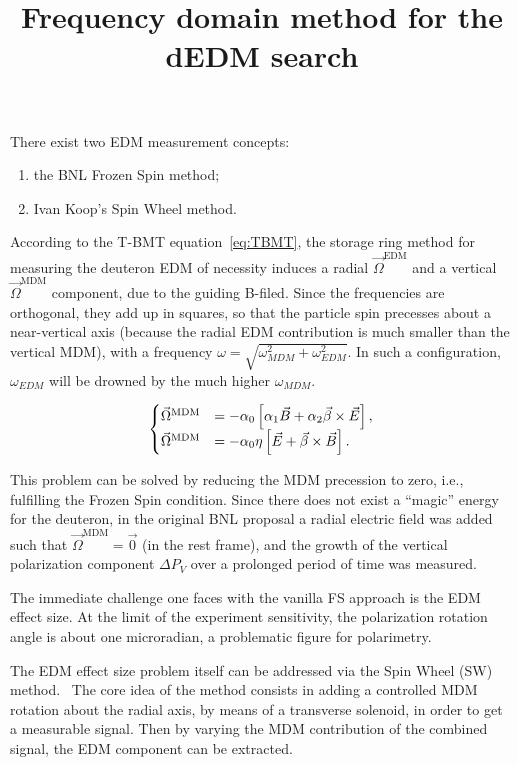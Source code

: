 \documentclass{article}
\newcommand{\W}{\Omega}
\newcommand{\w}{\omega}
\newcommand{\MDM}{^\mathrm{MDM}}
\newcommand{\EDM}{^\mathrm{EDM}}
\begin{document}
\title{Frequency domain method for the dEDM search}

There exist two EDM measurement concepts:
\begin{enumerate}
\item the BNL Frozen Spin method;
\item Ivan Koop's Spin Wheel method.
\end{enumerate}

According to the T-BMT equation~\eqref{eq:TBMT}, the storage ring method for measuring the deuteron EDM of necessity induces a radial $\vec\W\EDM$ and a vertical $\vec\W\MDM$ component, due to the guiding B-filed. Since the frequencies are orthogonal, they add up in squares, so that the particle spin precesses about a near-vertical axis (because the radial EDM contribution is much smaller than the vertical MDM), with a frequency $\w  = \sqrt{\w_{MDM}^2 + \w_{EDM}^2}$. In such a configuration, $\w_{EDM}$ will be drowned by the much higher $\w_{MDM}$. 

\begin{equation}\label{eq:TBMT}
  \begin{cases}
    \vec\W\MDM &= -\alpha_0\bkt*{\alpha_1\vec B + \alpha_2\vec\beta\times\vec E}, \\
    \vec\W\MDM &= -\alpha_0\eta\bkt*{\vec E + \vec\beta\times\vec B}.
  \end{cases}
\end{equation}

This problem can be solved by reducing the MDM precession to zero, i.e., fulfilling the Frozen Spin condition. Since there does not exist a ``magic'' energy for the deuteron, in the original BNL proposal a radial electric field was added such that $\vec\W\MDM = \vec 0$ (in the rest frame), and the growth of the vertical polarization component $\Delta P_V$ over a prolonged period of time was measured.~\cite{BNL_proposal}

The immediate challenge one faces with the vanilla FS approach is the EDM effect size. At the limit of the experiment sensitivity, the polarization rotation angle is about one microradian, a problematic figure for polarimetry.

The EDM effect size problem itself can be addressed via the Spin Wheel (SW) method.~\cite{Mane:SpinWheel} The core idea of the method consists in adding a controlled MDM rotation about the radial axis, by means of a transverse solenoid, in order to get a measurable signal. Then by varying the MDM contribution of the combined signal, the EDM component can be extracted.
\end{document}
